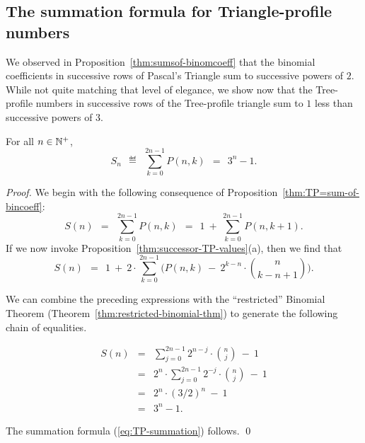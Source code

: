 \subsection{The summation formula for Triangle-profile numbers}

We observed in Proposition~\ref{thm:sumsof-binomcoeff} that the binomial coefficients in successive rows of Pascal's Triangle sum to successive powers of $2$.  While not quite matching that level of elegance, we show now that the Tree-profile numbers in successive rows of the Tree-profile triangle sum to $1$ less than successive powers of $3$.

\begin{prop}
\label{thm:TP-summation}
For all $n \in \mathbb{N}^+$,
\begin{equation}
\label{eq:TP-summation}
S_n \ \ \eqdef \ \ \sum_{k=0}^{2n-1} P(n,k) \ \ = \ \ 3^n -1.
\end{equation}
\end{prop}
 
\begin{proof}
We begin with the following consequence of Proposition~\ref{thm:TP=sum-of-bincoeff}:
\[
S(n) \ \ = \ \  \sum_{k=0}^{2n-1} P(n,k)  \ \ = \ \  1 \ + \ \sum_{k=0}^{2n-1} P(n,k+1).
\]
If we now invoke Proposition~\ref{thm:successor-TP-values}(a), then we find that
\[
S(n) \ \ = \ \ 1 \ + \ 2 \cdot \sum_{k=0}^{2n-1}   \big( P(n,k) \ - \ 2^{k-n} \cdot {n \choose {k-n+1}} \big).
\]

We can combine the preceding expressions with the ``restricted'' Binomial Theorem (Theorem~\ref{thm:restricted-binomial-thm}) to generate the following chain of equalities.

\begin{eqnarray*}
S(n) & = & 
\sum_{j=0}^{2n-1} 2^{n-j} \cdot {n \choose j} \ - \ 1  \\
     & = &
2^n \cdot \sum_{j=0}^{2n-1} 2^{-j}  \cdot {n \choose j} \ - \ 1 \\
     & = & 
2^n \cdot (3/2)^n \ - \ 1 \\
     & = &
3^n -1.
\end{eqnarray*}

The summation formula (\ref{eq:TP-summation}) follows.  \qed
\end{proof}
 


